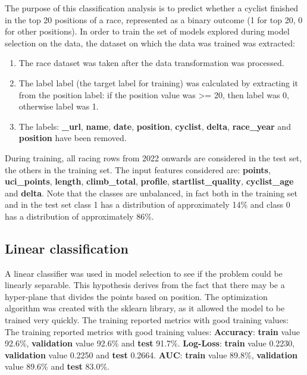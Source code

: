 \documentclass[a4paper, twoside]{article}
\begin{document}
The purpose of this classification analysis is to predict whether a cyclist finished in the top 20 positions of a race, represented as a binary outcome (1 for top 20, 0 for other positions). In order to train the set of models explored during model selection on the data, the dataset on which the data was trained was extracted:

\begin{enumerate}[noitemsep]

    \item The race dataset was taken after the data transformation was processed.

    \item The label label (the target label for training) was calculated by extracting it from the position label: if the position value was >= 20, then label was 0, otherwise label was 1.

    \item The labels: \textbf{\_url}, \textbf{name}, \textbf{date}, \textbf{position}, \textbf{cyclist}, \textbf{delta}, \textbf{race\_year} and \textbf{position} have been removed.

\end{enumerate}

During training, all racing rows from 2022 onwards are considered in the test set, the others in the training set. The input features considered are: \textbf{points}, \textbf{uci\_points}, \textbf{length}, \textbf{climb\_total}, \textbf{profile}, \textbf{startlist\_quality}, \textbf{cyclist\_age} and \textbf{delta}. Note that the classes are unbalanced, in fact both in the training set and in the test set class 1 has a distribution of approximately 14\% and class 0 has a distribution of approximately 86\%.

\subsection{Linear classification}

A linear classifier was used in model selection to see if the problem could be linearly separable. This hypothesis derives from the fact that there may be a hyper-plane that divides the points based on position.  The optimization algorithm was created with the sklearn library, as it allowed the model to be trained very quickly. The training reported metrics with good training values: The training reported metrics with good training values: \textbf{Accuracy}: \textbf{train} value 92.6\%, \textbf{validation} value 92.6\% and \textbf{test} 91.7\%. \textbf{Log-Loss}: \textbf{train} value 0.2230, \textbf{validation} value 0.2250 and \textbf{test} 0.2664. \textbf{AUC}: \textbf{train} value 89.8\%, \textbf{validation} value 89.6\% and \textbf{test} 83.0\%.
\end{document}

